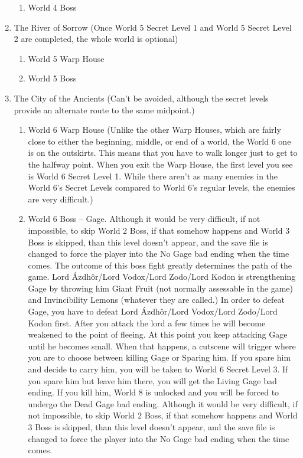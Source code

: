 \documentclass{gd-document}
\begin{document}
\begin{enumerate}
\begin{enumerate}
    \item World 4 Boss
    \end{enumerate}

  \item The River of Sorrow (Once World 5 Secret Level 1 and World 5
    Secret Level 2 are completed, the whole world is optional)

    \begin{enumerate}
    \item World 5 Warp House
    \item World 5 Boss
    \end{enumerate}

  \item The City of the Ancients (Can't be avoided, although the
    secret levels provide an alternate route to the same midpoint.)

    \begin{enumerate}
    \item World 6 Warp House (Unlike the other Warp Houses, which are
      fairly close to either the beginning, middle, or end of a world,
      the World 6 one is on the outskirts. This means that you have to
      walk longer just to get to the halfway point. When you exit the
      Warp House, the first level you see is World 6 Secret Level
      1. While there aren't as many enemies in the World 6's Secret
      Levels compared to World 6's regular levels, the enemies are
      very difficult.)

    \item World 6 Boss – Gage. Although it would be very difficult, if
      not impossible, to skip World 2 Boss, if that somehow happens
      and World 3 Boss is skipped, than this level doesn't appear, and
      the save file is changed to force the player into the No Gage
      bad ending when the time comes. The outcome of this boss fight
      greatly determines the path of the game. Lord Ázdhôr/Lord
      Vodox/Lord Zodo/Lord Kodon is strengthening Gage by throwing him
      Giant Fruit (not normally assessable in the game) and
      Invincibility Lemons (whatever they are called.) In order to
      defeat Gage, you have to defeat Lord Ázdhôr/Lord Vodox/Lord
      Zodo/Lord Kodon first. After you attack the lord a few times he
      will become weakened to the point of fleeing. At this point you
      keep attacking Gage until he becomes small. When that happens, a
      cutscene will trigger where you are to choose between killing
      Gage or Sparing him. If you spare him and decide to carry him,
      you will be taken to World 6 Secret Level 3. If you spare him
      but leave him there, you will get the Living Gage bad ending. If
      you kill him, World 8 is unlocked and you will be forced to
      undergo the Dead Gage bad ending. Although it would be very
      difficult, if not impossible, to skip World 2 Boss, if that
      somehow happens and World 3 Boss is skipped, than this level
      doesn't appear, and the save file is changed to force the player
      into the No Gage bad ending when the time comes.


\end{enumerate}
\end{enumerate}
\end{document}
